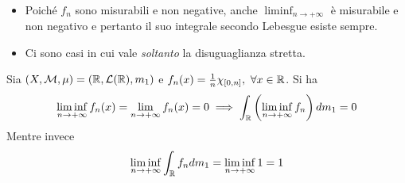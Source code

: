 \begin{observe}~{}
	\begin{itemize}
		\item Poiché $f_n$ sono misurabili e non negative, anche $\liminf_{n\to+\infty}$ è misurabile e non negativo e pertanto il suo integrale secondo Lebesgue esiste sempre. 
		\item Ci sono casi in cui vale \textit{soltanto} la disuguaglianza stretta.
	\end{itemize}
\end{observe}
\begin{examplewt}
	Sia $\left(X,\mathcal{M},\mu\right)=\left(\mathbb{R},\mathcal{L}(\mathbb{R}),m_1\right)$ e $f_n(x)=\frac{1}{n}\chi_{\left[0,n\right]},\ \forall x\in\realset$.	Si ha
	\begin{equation*}
		\liminf_{n\to+\infty}f_n(x)=\lim_{n\to+\infty}f_n(x)=0\\
		\implies\int_{\mathbb{R}}\left(\liminf_{n\to+\infty}f_n\right)dm_1=0
	\end{equation*}
	Mentre invece
	\begin{equation*}
		\liminf_{n\to+\infty}\int_{\mathbb{R}}f_ndm_1=\liminf_{n\to+\infty}1=1
	\end{equation*}
\end{examplewt}
